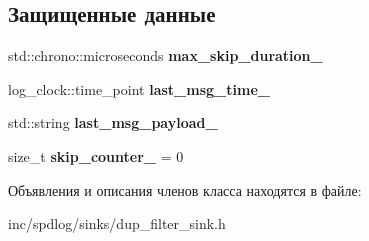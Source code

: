 \subsection*{Защищенные данные}
\begin{DoxyCompactItemize}
\item 
\mbox{\label{classspdlog_1_1sinks_1_1dup__filter__sink_a69ee670ea997248a9cd92f3851b2808d}} 
std\+::chrono\+::microseconds {\bfseries max\+\_\+skip\+\_\+duration\+\_\+}
\item 
\mbox{\label{classspdlog_1_1sinks_1_1dup__filter__sink_a49d025b1ae24ec2712dcfd02f96d75ac}} 
log\+\_\+clock\+::time\+\_\+point {\bfseries last\+\_\+msg\+\_\+time\+\_\+}
\item 
\mbox{\label{classspdlog_1_1sinks_1_1dup__filter__sink_a529e98f653fe983691c8537d230cfab3}} 
std\+::string {\bfseries last\+\_\+msg\+\_\+payload\+\_\+}
\item 
\mbox{\label{classspdlog_1_1sinks_1_1dup__filter__sink_ab38a89017c68c21d06ba832710f4dfde}} 
size\+\_\+t {\bfseries skip\+\_\+counter\+\_\+} = 0
\end{DoxyCompactItemize}


Объявления и описания членов класса находятся в файле\+:\begin{DoxyCompactItemize}
\item 
inc/spdlog/sinks/dup\+\_\+filter\+\_\+sink.\+h\end{DoxyCompactItemize}
